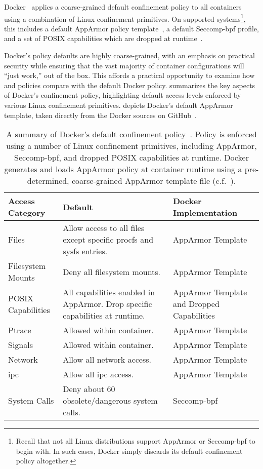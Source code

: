 Docker~\cite{docker_security} applies a coarse-grained default confinement policy to all
containers using a combination of Linux confinement primitives. On supported
systems\footnote{Recall that not all Linux distributions support AppArmor or Seccomp-bpf
to begin with. In such cases, Docker simply discards its default confinement policy
altogether.}, this includes a default AppArmor policy template~\cite{docker_apparmor,
docker_default_apparmor}, a default Seccomp-bpf profile, and a set of POSIX capabilities
which are dropped at runtime~\cite{docker_security}.

Docker's policy defaults are highly coarse-grained, with an emphasis on practical security
while ensuring that the vast majority of container configurations will \enquote{just
work,} out of the box. This affords a practical opportunity to examine how \bpfbox{} and
\bpfcontain{} policies compare with the default Docker policy. 
summarizes the key aspects of Docker's confinement policy, highlighting default access
levels enforced by various Linux confinement primitives.  depicts
Docker's default AppArmor template, taken directly from the Docker sources on
GitHub~\cite{docker_default_apparmor}.

\begin{table}[htpb]
  \centering
  \caption[The default Docker confinement policy]{
    A summary of Docker's default confinement policy~\cite{docker_security,
    docker_apparmor, docker_default_apparmor}. Policy is enforced using a number of Linux
    confinement primitives, including AppArmor, Seccomp-bpf, and dropped POSIX
    capabilities at runtime. Docker generates and loads AppArmor policy at container
    runtime using a pre-determined, coarse-grained AppArmor template file
    (c.f.\ ).
  }%
  \label{tab:docker-default}
  \footnotesize
  \begin{tabular}{lp{2in}p{1.6in}}
  \toprule
  Access Category & Default & Docker Implementation \\
  \midrule
  Files & Allow access to all files except specific procfs and sysfs entries. & AppArmor Template \\
  Filesystem Mounts & Deny all filesystem mounts. & AppArmor Template \\
  POSIX Capabilities & All capabilities enabled in AppArmor.  Drop specific capabilities at runtime. & AppArmor Template and Dropped Capabilities \\
  Ptrace & Allowed within container. & AppArmor Template \\
  Signals & Allowed within container. & AppArmor Template \\
  Network & Allow all network access. & AppArmor Template \\
  \gls{ipc} & Allow all \gls{ipc} access. & AppArmor Template \\
  System Calls & Deny about 60 obsolete/dangerous system calls. & Seccomp-bpf \\
  \bottomrule
  \end{tabular}
\end{table}

